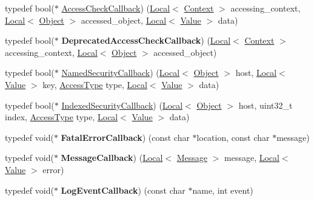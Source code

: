 \begin{DoxyCompactItemize}
\item 
typedef bool($\ast$ \hyperlink{namespacev8_a1024fb358d107c1494163217830688e6}{Access\+Check\+Callback}) (\hyperlink{classv8_1_1Local}{Local}$<$ \hyperlink{classv8_1_1Context}{Context} $>$ accessing\+\_\+context, \hyperlink{classv8_1_1Local}{Local}$<$ \hyperlink{classv8_1_1Object}{Object} $>$ accessed\+\_\+object, \hyperlink{classv8_1_1Local}{Local}$<$ \hyperlink{classv8_1_1Value}{Value} $>$ data)
\item 
typedef bool($\ast$ {\bfseries Deprecated\+Access\+Check\+Callback}) (\hyperlink{classv8_1_1Local}{Local}$<$ \hyperlink{classv8_1_1Context}{Context} $>$ accessing\+\_\+context, \hyperlink{classv8_1_1Local}{Local}$<$ \hyperlink{classv8_1_1Object}{Object} $>$ accessed\+\_\+object)\hypertarget{namespacev8_a26a50b38ae59fa451377ad1c32d2e6e6}{}\label{namespacev8_a26a50b38ae59fa451377ad1c32d2e6e6}

\item 
typedef bool($\ast$ \hyperlink{namespacev8_ab5cafda0c556bba990c660ce9c904e0d}{Named\+Security\+Callback}) (\hyperlink{classv8_1_1Local}{Local}$<$ \hyperlink{classv8_1_1Object}{Object} $>$ host, \hyperlink{classv8_1_1Local}{Local}$<$ \hyperlink{classv8_1_1Value}{Value} $>$ key, \hyperlink{namespacev8_add8bef6469c5b94706584124e610046c}{Access\+Type} type, \hyperlink{classv8_1_1Local}{Local}$<$ \hyperlink{classv8_1_1Value}{Value} $>$ data)
\item 
typedef bool($\ast$ \hyperlink{namespacev8_aebbcc7837753e51112d944ad96520da1}{Indexed\+Security\+Callback}) (\hyperlink{classv8_1_1Local}{Local}$<$ \hyperlink{classv8_1_1Object}{Object} $>$ host, uint32\+\_\+t index, \hyperlink{namespacev8_add8bef6469c5b94706584124e610046c}{Access\+Type} type, \hyperlink{classv8_1_1Local}{Local}$<$ \hyperlink{classv8_1_1Value}{Value} $>$ data)
\item 
typedef void($\ast$ {\bfseries Fatal\+Error\+Callback}) (const char $\ast$location, const char $\ast$message)\hypertarget{namespacev8_abc93f69508701f18dc5cc0ce165616aa}{}\label{namespacev8_abc93f69508701f18dc5cc0ce165616aa}

\item 
typedef void($\ast$ {\bfseries Message\+Callback}) (\hyperlink{classv8_1_1Local}{Local}$<$ \hyperlink{classv8_1_1Message}{Message} $>$ message, \hyperlink{classv8_1_1Local}{Local}$<$ \hyperlink{classv8_1_1Value}{Value} $>$ error)\hypertarget{namespacev8_a871380126ff63a699e78cb83d8d613a6}{}\label{namespacev8_a871380126ff63a699e78cb83d8d613a6}

\item 
typedef void($\ast$ {\bfseries Log\+Event\+Callback}) (const char $\ast$name, int event)\hypertarget{namespacev8_a1516c6948fdca41f79410b7ff91aeaf0}{}\label{namespacev8_a1516c6948fdca41f79410b7ff91aeaf0}


\end{DoxyCompactItemize}
